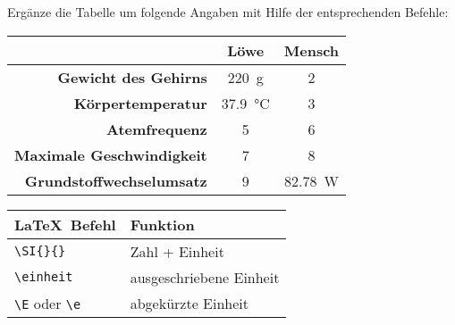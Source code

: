 \documentclass["WS\space 16-17\space -\space LaTeX-Kurs\space -\space Praesentation\space -\space 3.tex"]{subfiles}
\begin{document}
\begin{frame}[fragile]
	\vspace{-0.3cm}
	\begin{Aufgabe}
	Ergänze die Tabelle um folgende Angaben mit Hilfe der entsprechenden Befehle:
	\end{Aufgabe}
	\begin{outputbox}
		\begin{center}
			\begin{tabular}{r|cc}
				\hline
				&	\textbf{Löwe}										& \textbf{Mensch} 						\\ \hline
				\textbf{Gewicht des Gehirns}		&	\SI{220}{\g}										& 2			\\ 
				\textbf{Körpertemperatur}			&	\SI{37.9}{\degreeCelsius}							& 3	\\
				\textbf{Atemfrequenz}				&	5								& 6 					\\
				\textbf{Maximale Geschwindigkeit}	&	7								& 8				\\ 
				\textbf{Grundstoffwechselumsatz}	& 9	&  \SI{82.78}{\watt}\\
				\hline
			\end{tabular}
		\end{center}
	\end{outputbox}
	
	\begin{center}
		\begin{tabular}{ll}
			\toprule
			\LaTeX\ Befehl						&	Funktion						\\ \midrule
			\lstinline|\SI{}{}|					&	Zahl + Einheit					\\
			\lstinline|\einheit|				&	ausgeschriebene Einheit			\\
			\lstinline|\E| oder \lstinline|\e|	&	abgekürzte Einheit				\\
			\bottomrule
		\end{tabular}
	\end{center}
	\vspace{0.1cm}
\end{frame}
\end{document}
